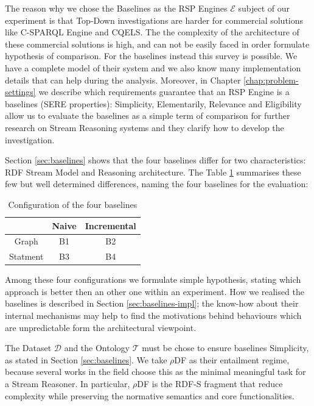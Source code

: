 The reason why we chose the Baselines as the RSP Engines $\mathcal{E}$ subject of our experiment is that Top-Down investigations are harder for commercial solutions like C-SPARQL Engine and CQELS. The the complexity of the architecture of these commercial solutions is high, and can not be easily faced in order formulate hypothesis of comparison. For the baselines instead this survey is possible. We have a complete model of their system and we also know many implementation details that can help during the analysis. Moreover,  in Chapter \ref{chap:problem-settings} we describe which requirements guarantee that an RSP Engine is a baselines (SERE properties): Simplicity, Elementarily, Relevance and Eligibility allow us to evaluate the baselines as a simple term of comparison for further research on Stream Reasoning systems and they clarify how to develop the investigation.
 
Section \ref{sec:baselines} shows that the four baselines differ for two characteristics: RDF Stream Model and Reasoning architecture. The Table \ref{tab:baselines-names} summarises these few but well determined differences, naming the four baselines for the evaluation:\begin{table}[htb]
\scriptsize
\centering
\begin{tabular}{c|cc} %
	\hline
         & Naive & Incremental\\
	\hline
	Graph        &  B1      & B2\\
	Statment   &  B3   & B4\\
	\hline %
\end{tabular}
\caption{Configuration of the four baselines}
\label{tab:baselines-names}
\end{table}

\noindent Among these four configurations we formulate simple hypothesis, stating which approach is better then an other one within an experiment. How we realised the baselines is described in Section \ref{sec:baselines-impl}; the know-how about their internal mechanisms may help to find the motivations behind behaviours which are unpredictable form the architectural viewpoint. 

The Dataset  $\mathcal{D}$ and the Ontology $\mathcal{T}$ must be chose to ensure baselines Simplicity, as stated in Section \ref{sec:baselines}. We take $\rho$DF  \cite{DBLP:conf/esws/MunozPG07} as their entailment regime, because several works in the field \cite{DBLP:conf/semweb/UrbaniMJHB13} choose this as the minimal meaningful task for a Stream Reasoner. In particular, $\rho$DF is the RDF-S fragment that reduce complexity while preserving the normative semantics and core functionalities. 

